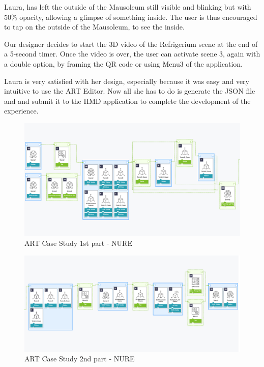 Laura, has left the outside of the Mausoleum still visible and blinking but with 50\% opacity, allowing a glimpse of something inside. The user is thus encouraged to tap on the outside of the Mausoleum, to see the inside. 

Our designer decides to start the 3D video of the Refrigerium scene at the end of a 5-second timer. Once the video is over, the user can activate scene 3, again with a double option, by framing the QR code or using Menu3 of the application. 

Laura is very satisfied with her design, especially because it was easy and very intuitive to use the ART Editor. Now all she has to do is generate the JSON file and and submit it to the HMD application to complete the development of the experience.

\begin{figure}[h]
    \centering
    \includegraphics[width=\linewidth]{Figures/Editor/nure/NureExample1.png}
    \caption{ART Case Study 1st part - NURE}
    \label{fig:nure1}
\end{figure}

\begin{figure}[h]
    \centering
    \includegraphics[width=\linewidth]{Figures/Editor/nure/NureExample2.png}
    \caption{ART Case Study 2nd part - NURE}
    \label{fig:nure2}
\end{figure}